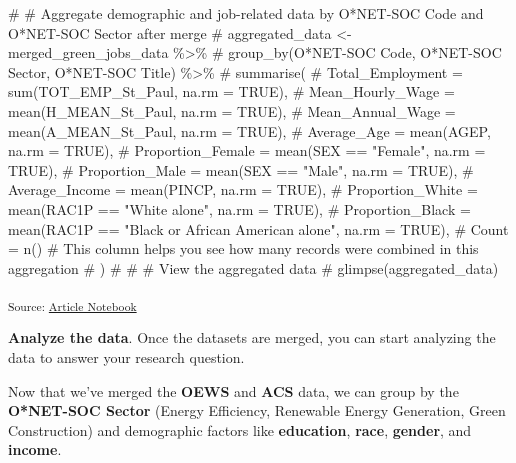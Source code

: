 \documentclass[
  letterpaper,
  DIV=11,
  numbers=noendperiod]{scrartcl}
\newenvironment{Shaded}{\begin{snugshade}}{\end{snugshade}}
\newcommand{\CommentTok}[1]{\textcolor[rgb]{0.37,0.37,0.37}{#1}}
\begin{document}
\begin{Shaded}
\begin{Highlighting}[]
\CommentTok{\# \# Aggregate demographic and job{-}related data by O*NET{-}SOC Code and O*NET{-}SOC Sector after merge}
\CommentTok{\# aggregated\_data \textless{}{-} merged\_green\_jobs\_data \%\textgreater{}\%}
\CommentTok{\#   group\_by(\textasciigrave{}O*NET{-}SOC Code\textasciigrave{}, \textasciigrave{}O*NET{-}SOC Sector\textasciigrave{}, \textasciigrave{}O*NET{-}SOC Title\textasciigrave{}) \%\textgreater{}\%}
\CommentTok{\#   summarise(}
\CommentTok{\#     Total\_Employment = sum(TOT\_EMP\_St\_Paul, na.rm = TRUE),}
\CommentTok{\#     Mean\_Hourly\_Wage = mean(H\_MEAN\_St\_Paul, na.rm = TRUE),}
\CommentTok{\#     Mean\_Annual\_Wage = mean(A\_MEAN\_St\_Paul, na.rm = TRUE),}
\CommentTok{\#     Average\_Age = mean(AGEP, na.rm = TRUE),}
\CommentTok{\#     Proportion\_Female = mean(SEX == "Female", na.rm = TRUE),}
\CommentTok{\#     Proportion\_Male = mean(SEX == "Male", na.rm = TRUE),}
\CommentTok{\#     Average\_Income = mean(PINCP, na.rm = TRUE),}
\CommentTok{\#     Proportion\_White = mean(RAC1P == "White alone", na.rm = TRUE),}
\CommentTok{\#     Proportion\_Black = mean(RAC1P == "Black or African American alone", na.rm = TRUE),}
\CommentTok{\#     Count = n()  \# This column helps you see how many records were combined in this aggregation}
\CommentTok{\#   )}
\CommentTok{\# }
\CommentTok{\# \# View the aggregated data}
\CommentTok{\# glimpse(aggregated\_data)}
\end{Highlighting}
\end{Shaded}

\textsubscript{Source:
\href{https://beeckcenter.github.io/climate-equity-workforce/index-preview.html}{Article
Notebook}}

\textbf{Analyze the data}. Once the datasets are merged, you can start
analyzing the data to answer your research question.

Now that we've merged the \textbf{OEWS} and \textbf{ACS} data, we can
group by the \textbf{O*NET-SOC Sector} (Energy Efficiency, Renewable
Energy Generation, Green Construction) and demographic factors like
\textbf{education}, \textbf{race}, \textbf{gender}, and \textbf{income}.
\end{document}
